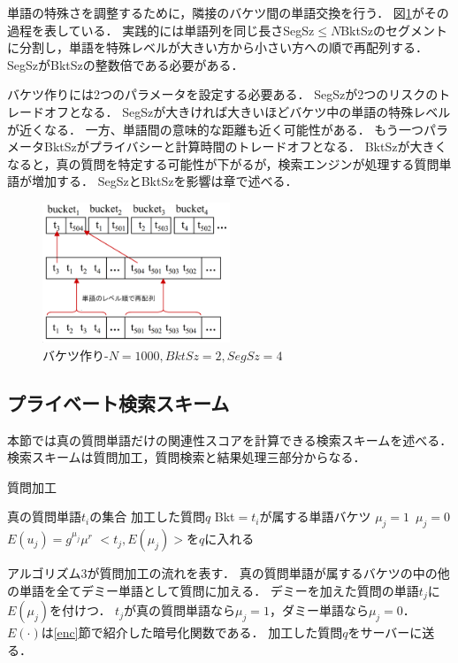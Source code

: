 \documentclass{jsarticle}
\theoremstyle{definition}
\begin{document}
単語の特殊さを調整するために，隣接のバケツ間の単語交換を行う．
図\ref{fig:pp2}がその過程を表している．
実践的には単語列を同じ長さSegSz$\leq N$BktSzのセグメントに分割し，単語を特殊レベルが大きい方から小さい方への順で再配列する．
SegSzがBktSzの整数倍である必要がある．

バケツ作りには2つのパラメータを設定する必要ある．
SegSzが2つのリスクのトレードオフとなる．
SegSzが大きければ大きいほどバケツ中の単語の特殊レベルが近くなる．
一方、単語間の意味的な距離も近く可能性がある．
もう一つパラメータBktSzがプライバシーと計算時間のトレードオフとなる．
BktSzが大きくなると，真の質問を特定する可能性が下がるが，検索エンジンが処理する質問単語が増加する．
SegSzとBktSzを影響は章で述べる．

\begin{figure}
    \centering
    \includegraphics[width=0.5\textwidth,height=0.3\textwidth,natwidth=1600,natheight=1196]{rk13.png}
	\caption{バケツ作り-$N=1000,BktSz=2,SegSz=4$}\label{fig:pp2}
\end{figure}

\subsection{プライベート検索スキーム}
本節では真の質問単語だけの関連性スコアを計算できる検索スキームを述べる．
検索スキームは質問加工，質問検索と結果処理三部分からなる．

\begin{algorithm}
\caption{質問加工}
\begin{algorithmic}[1]
	\Require 真の質問単語$t_i$の集合
	\Ensure 加工した質問$q$
	\State Bkt$=t_i$が属する単語バケツ
		 $\mu_j=1$
		\Else $\,\mu_j=0$
		\EndIf
		\State $E(u_j) = g^{\mu_j}\mu^r$
		\State $<t_j,E(\mu_j)>$を$q$に入れる
		\EndFor
	\EndFor
\EndFunction
\end{algorithmic}
\end{algorithm}

アルゴリズム3が質問加工の流れを表す．
真の質問単語が属するバケツの中の他の単語を全てデミー単語として質問に加える．
デミーを加えた質問の単語$t_j$に$E(\mu_j)$を付けつ．
$t_j$が真の質問単語なら$\mu_j=1$，ダミー単語なら$\mu_j=0$．
$E(\cdot)$は\ref{enc}節で紹介した暗号化関数である．
加工した質問$q$をサーバーに送る．
\end{document}
